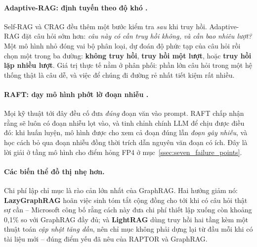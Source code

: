\paragraph{Adaptive-RAG: định tuyến theo độ khó \cite{jeong2024adaptiverag}.} Self-RAG và CRAG đều thêm một bước kiểm tra \emph{sau} khi truy hồi. Adaptive-RAG đặt câu hỏi sớm hơn: \emph{câu này có cần truy hồi không, và cần bao nhiêu lượt?} Một mô hình nhỏ đóng vai bộ phân loại, dự đoán độ phức tạp của câu hỏi rồi chọn một trong ba đường: \textbf{không truy hồi}, \textbf{truy hồi một lượt}, hoặc \textbf{truy hồi lặp nhiều lượt}. Giá trị thực tế nằm ở phân phối: phần lớn câu hỏi trong một hệ thống thật là câu dễ, và việc để chúng đi đường rẻ nhất tiết kiệm rất nhiều.

\paragraph{RAFT: dạy mô hình phớt lờ đoạn nhiễu \cite{zhang2024raft}.} Mọi kỹ thuật tới đây đều cố đưa \emph{đúng} đoạn văn vào prompt. RAFT chấp nhận rằng sẽ luôn có đoạn nhiễu lọt vào, và tinh chỉnh chính LLM để chịu được điều đó: khi huấn luyện, mô hình được cho xem cả đoạn đúng lẫn \emph{đoạn gây nhiễu}, và học cách bỏ qua đoạn nhiễu đồng thời trích dẫn nguyên văn đoạn có ích. Đây là lời giải ở tầng mô hình cho điểm hỏng FP4 ở mục~\ref{ssec:seven_failure_points}.

\paragraph{Các biến thể đồ thị nhẹ hơn.} Chi phí lập chỉ mục là rào cản lớn nhất của GraphRAG. Hai hướng giảm nó: \textbf{LazyGraphRAG} hoãn việc sinh tóm tắt cộng đồng cho tới khi có câu hỏi thật sự cần -- Microsoft công bố rằng cách này đưa chi phí thiết lập xuống còn khoảng 0{,}1\% so với GraphRAG đầy đủ; và \textbf{LightRAG} \cite{guo2024lightrag} dùng truy hồi hai tầng kèm một thuật toán \emph{cập nhật tăng dần}, nên chỉ mục không phải dựng lại từ đầu mỗi khi có tài liệu mới -- đúng điểm yếu đã nêu của RAPTOR và GraphRAG.
